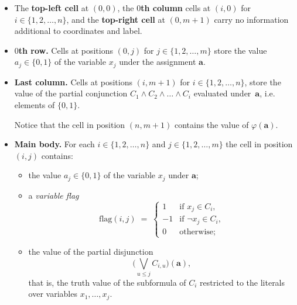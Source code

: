 \documentclass{article}
\theoremstyle{plain}
\theoremstyle{definition}
\newcommand{\masha}[1]{{\leavevmode\color{magenta}{#1}}}
\newcommand{\tuple}{\mathbf}
\begin{document}
\begin{itemize}    
    \item The \textbf{top-left cell} at $(0,0)$, the \textbf{$0$th column} cells at $(i,0)$ \linebreak for $i \in \{1,2,\dots, n\}$, and the \textbf{top-right cell} at $(0, m+1)$ carry no information additional to coordinates and label.
    
    \item \textbf{$0$th row.} Cells at positions $(0,j)$ for $j \in \{1,2,\dots,m\}$ store the value
    $a_j \in \{0,1\}$ of the variable $x_j$ under the assignment $\tuple a$.
    
    \item  \textbf{Last column.} Cells at positions $(i, m+1)$
    for $i \in \{1,2, \dots ,n\}$, store the value of the partial conjunction
$C_1 \wedge C_2 \wedge \dots \wedge C_i$ evaluated under~$\tuple a$, i.e. elements of $\{0,1\}$. %

Notice that the cell in position $(n, m+1)$ contains the value of $\varphi(\tuple a)$. 
    \item \textbf{Main body.} For each $i \in \{1,2,\dots,n\}$ and $j \in  \{1,2,\dots,m\}$ the cell in position $(i,j)$ contains:
\begin{itemize}
         \item the value $a_j \in \{0,1\}$ of the variable $x_j$ under $\tuple a$;
  \item a \emph{variable flag}
  \[
  \mathrm{flag}(i,j) \;=\;
  \begin{cases}
    1 & \text{if } x_j \in C_i, \\[6pt]
    -1 & \text{if } \neg x_j \in C_i, \\[6pt]
    0 & \text{otherwise; }
  \end{cases}
  \]
  \item the value of the partial disjunction
  \[
  \bigl(\bigvee_{u \leq j} C_{i,u}\bigr) (\tuple a),
  \]
    that is, the truth value of the subformula of \(C_i\) restricted to the literals over variables \(x_1, \dots, x_j\). %



\end{itemize}
    

\end{itemize}
\end{document}
